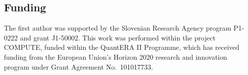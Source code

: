 \documentclass[12pt, reqno, final, a4paper]{amsart}
\theoremstyle{plain}
\theoremstyle{definition}
\theoremstyle{remark}
\newcommand{\1}{\mathbf 1}
\begin{document}
\subsection*{Funding} 
The first author was supported by the Slovenian Research Agency program P1-0222 and grant J1-50002. This work was performed
within the project COMPUTE, funded within the QuantERA II Programme, which has received funding from the European Union's Horizon 2020 research and innovation program under Grant Agreement No.~101017733. 






\end{document}
